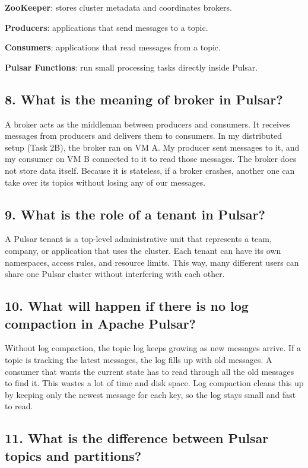 \documentclass[11pt,a4paper]{article}
\begin{document}
  \textbf{ZooKeeper}: stores cluster metadata and coordinates brokers.

  \textbf{Producers}: applications that send messages to a topic.

  \textbf{Consumers}: applications that read messages from a topic.

  \textbf{Pulsar Functions}: run small processing tasks directly inside Pulsar.


\subsection*{8. What is the meaning of broker in Pulsar?}

A broker acts as the middleman between producers and consumers. It receives messages from
producers and delivers them to consumers.
In my distributed setup (Task 2B), the broker ran on VM A.
My producer sent messages to it, and my consumer on VM B connected to it to read those messages. 
The broker does not store data itself. 
Because it is stateless, if a broker crashes, another one can take over its topics without losing any of our messages.

\subsection*{9. What is the role of a tenant in Pulsar?}

A Pulsar tenant is a top-level administrative unit that represents a team, company, or
application that uses the cluster. Each tenant can have its own namespaces, access rules,
and resource limits. This way, many different users can share one Pulsar cluster without
interfering with each other.

\subsection*{10. What will happen if there is no log compaction in Apache Pulsar?}

Without log compaction, the topic log keeps growing as new messages arrive. If a topic is tracking the latest messages, the log fills up with old messages. 
A consumer that wants the current state has to read through all the old messages to
find it. This wastes a lot of time and disk space. 
Log compaction cleans this up by keeping only the newest message for each key, so the log stays small and fast to read.

\subsection*{11. What is the difference between Pulsar topics and partitions?}
\end{document}
